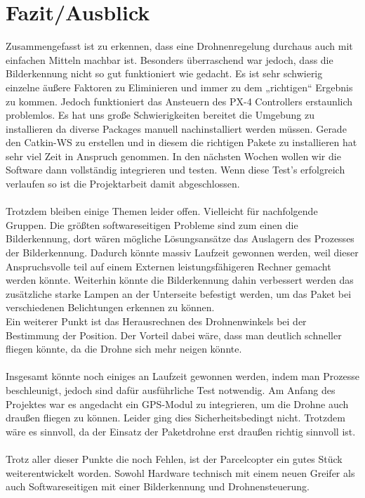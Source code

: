 \section{Fazit/Ausblick}
Zusammengefasst ist zu erkennen, dass eine Drohnenregelung durchaus auch mit einfachen Mitteln machbar ist. Besonders überraschend war jedoch, dass die Bilderkennung nicht so gut funktioniert wie gedacht. Es ist sehr schwierig einzelne äußere Faktoren zu Eliminieren und immer zu dem „richtigen“ Ergebnis zu kommen. Jedoch funktioniert das Ansteuern des PX-4 Controllers erstaunlich problemlos. Es hat uns große Schwierigkeiten bereitet die Umgebung zu installieren da diverse Packages manuell nachinstalliert werden müssen. Gerade den Catkin-WS zu erstellen und in diesem die richtigen Pakete zu installieren hat sehr viel Zeit in Anspruch genommen.
In den nächsten Wochen wollen wir die Software dann vollständig integrieren und testen. Wenn diese Test's erfolgreich verlaufen so ist die Projektarbeit damit abgeschlossen.\\
\\
Trotzdem bleiben einige Themen leider offen. Vielleicht für nachfolgende Gruppen.
Die größten softwareseitigen Probleme sind zum einen die Bilderkennung, dort wären mögliche Lösungsansätze das Auslagern des Prozesses der Bilderkennung. Dadurch könnte massiv Laufzeit gewonnen werden, weil dieser Anspruchsvolle teil auf einem Externen leistungsfähigeren Rechner gemacht werden könnte. 
Weiterhin könnte die Bilderkennung dahin verbessert werden das zusätzliche starke Lampen an der Unterseite befestigt werden, um das Paket bei verschiedenen Belichtungen erkennen zu können.\\
Ein weiterer Punkt ist das Herausrechnen des Drohnenwinkels bei der Bestimmung der Position. Der Vorteil dabei wäre, dass man deutlich schneller fliegen könnte, da die Drohne sich mehr neigen könnte.\\
\\
Insgesamt könnte noch einiges an Laufzeit gewonnen werden, indem man Prozesse beschleunigt, jedoch sind dafür ausführliche Test notwendig.
Am Anfang des Projektes war es angedacht ein GPS-Modul zu integrieren, um die Drohne auch draußen fliegen zu können. Leider ging dies Sicherheitsbedingt nicht. Trotzdem wäre es sinnvoll, da der Einsatz der Paketdrohne erst draußen richtig sinnvoll ist.\\
\\
Trotz aller dieser Punkte die noch Fehlen, ist der Parcelcopter ein gutes Stück weiterentwickelt worden. Sowohl Hardware technisch mit einem neuen Greifer als auch Softwareseitigen mit einer Bilderkennung und Drohnensteuerung.\\
\\
